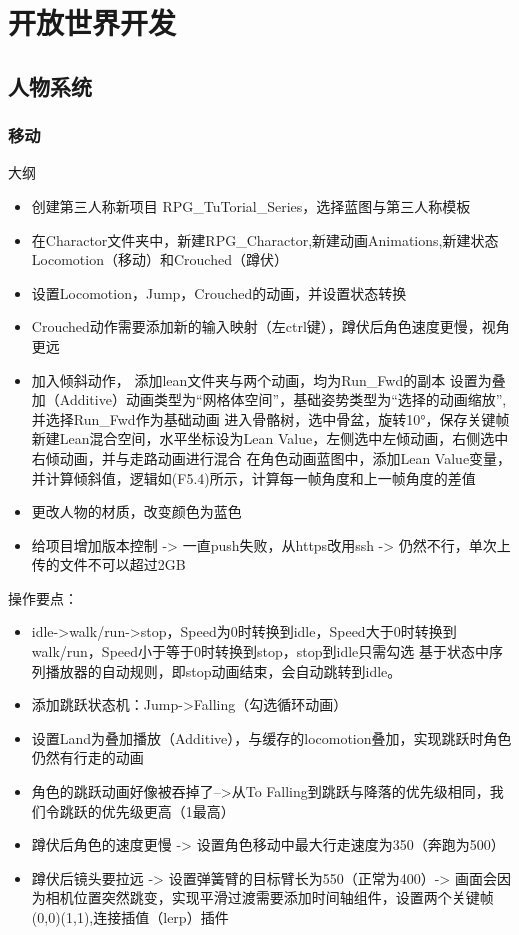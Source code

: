 \documentclass[11pt,oneside]{book}
\begin{document}
\part{开放世界开发}

\chapter{人物系统}

\section{移动}

大纲
\begin{itemize}
    \item 创建第三人称新项目 RPG\_TuTorial\_Series，选择蓝图与第三人称模板
    \item 在Charactor文件夹中，新建RPG\_Charactor,新建动画Animations,新建状态Locomotion（移动）和Crouched（蹲伏）
    \item 设置Locomotion，Jump，Crouched的动画，并设置状态转换
    \item Crouched动作需要添加新的输入映射（左ctrl键），蹲伏后角色速度更慢，视角更远
    \item 加入倾斜动作，
    \subitem 添加lean文件夹与两个动画，均为Run\_Fwd的副本
    \subitem 设置为叠加（Additive）动画类型为“网格体空间”，基础姿势类型为“选择的动画缩放”,并选择Run\_Fwd作为基础动画
    \subitem 进入骨骼树，选中骨盆，旋转10°，保存关键帧
    \subitem 新建Lean混合空间，水平坐标设为Lean Value，左侧选中左倾动画，右侧选中右倾动画，并与走路动画进行混合
    在角色动画蓝图中，添加Lean Value变量，并计算倾斜值，逻辑如(F5.4)所示，计算每一帧角度和上一帧角度的差值
    \item 更改人物的材质，改变颜色为蓝色
    \item 给项目增加版本控制 -> 一直push失败，从https改用ssh -> 仍然不行，单次上传的文件不可以超过2GB
\end{itemize}

操作要点：
\begin{itemize}
\item idle->walk/run->stop，Speed为0时转换到idle，Speed大于0时转换到walk/run，Speed小于等于0时转换到stop，stop到idle只需勾选{\color{blue} 基于状态中序列播放器的自动规则}，即stop动画结束，会自动跳转到idle。
\item 添加跳跃状态机：Jump->Falling（勾选循环动画）
\item 设置Land为叠加播放（Additive），与缓存的locomotion叠加，实现跳跃时角色仍然有行走的动画
\item 角色的跳跃动画好像被吞掉了-->从To Falling到跳跃与降落的优先级相同，我们令跳跃的优先级更高（1最高）
\item 蹲伏后角色的速度更慢 -> 设置角色移动中最大行走速度为350（奔跑为500）
\item 蹲伏后镜头要拉远 -> 设置弹簧臂的目标臂长为550（正常为400）-> 画面会因为相机位置突然跳变，实现平滑过渡需要添加时间轴组件，设置两个关键帧(0,0)(1,1),连接插值（lerp）插件 
\end{itemize}
\end{document}
